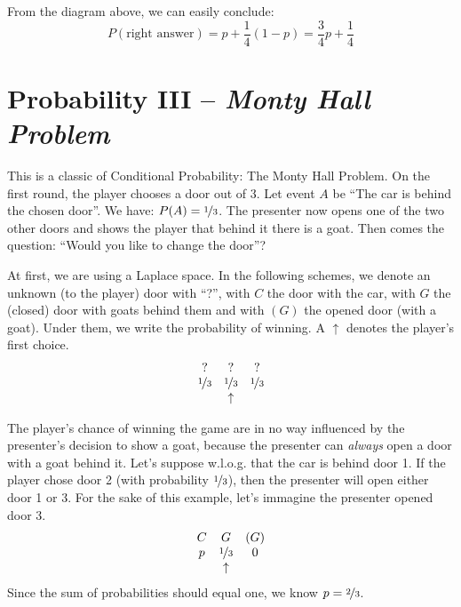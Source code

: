 \documentclass{article}
\begin{document}
\begin{figure}[H]
\end{figure}
From the diagram above, we can easily conclude: \[P(\text{right answer}) = p + \frac{1}{4}(1-p) = \frac{3}{4}p + \frac{1}{4}\]

\section{Probability III -- \textit{Monty Hall Problem}}
This is a classic of Conditional Probability: The Monty Hall Problem.
On the first round, the player chooses a door out of 3. 
Let event $A$ be ``The car is behind the chosen door''. We have: $P(A) = \nicefrac{1}{3}$.
The presenter now opens one of the two other doors and shows the player that behind it there is a goat. 
Then comes the question: ``Would you like to change the door''?

At first, we are using a Laplace space.
In the following schemes, we denote an unknown (to the player) door with ``?'', with $C$ the door with the car, with $G$ the (closed) door with goats behind them and with $(G)$ the opened door (with a goat). Under them, we write the probability of winning. A $\uparrow$ denotes the player's first choice.
\[\begin{array}{ccc}
     ? & ? & ?  \\
     \nicefrac{1}{3} & \nicefrac{1}{3} & \nicefrac{1}{3} \\
     & \uparrow & 
\end{array}\]

The player's chance of winning the game are in no way influenced by the presenter's decision to show a goat, because the presenter can \textit{always} open a door with a goat behind it. 
Let's suppose w.l.o.g. that the car is behind door 1. 
If the player chose door 2 (with probability $\nicefrac{1}{3}$), then the presenter will open either door 1 or 3. For the sake of this example, let's immagine the presenter opened door 3.
\[\begin{array}{ccc}
     C & G & (G)  \\
     p & \nicefrac{1}{3} & 0 \\
     & \uparrow & 
\end{array}\]
Since the sum of probabilities should equal one, we know $p = \nicefrac{2}{3}$.
\end{document}

